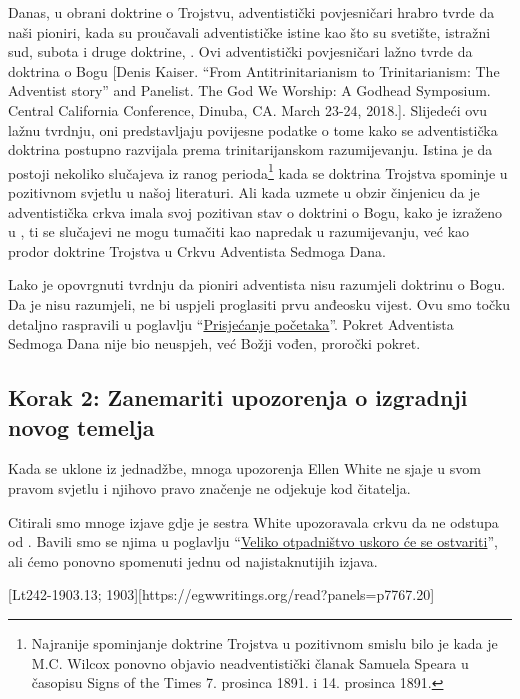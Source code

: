 Danas, u obrani doktrine o Trojstvu, adventistički povjesničari hrabro tvrde da naši pioniri, kada su proučavali adventističke istine kao što su svetište, istražni sud, subota i druge doktrine, . Ovi adventistički povjesničari lažno tvrde da doktrina o Bogu [Denis Kaiser. “From Antitrinitarianism to Trinitarianism: The Adventist story” and Panelist. The God We Worship: A Godhead Symposium. Central California Conference, Dinuba, CA. March 23-24, 2018.]. Slijedeći ovu lažnu tvrdnju, oni predstavljaju povijesne podatke o tome kako se adventistička doktrina postupno razvijala prema trinitarijanskom razumijevanju. Istina je da postoji nekoliko slučajeva iz ranog perioda\footnote{Najranije spominjanje doktrine Trojstva u pozitivnom smislu bilo je kada je M.C. Wilcox ponovno objavio neadventistički članak Samuela Speara u časopisu Signs of the Times 7. prosinca 1891. i 14. prosinca 1891.} kada se doktrina Trojstva spominje u pozitivnom svjetlu u našoj literaturi. Ali kada uzmete u obzir činjenicu da je adventistička crkva imala svoj pozitivan stav o doktrini o Bogu, kako je izraženo u , ti se slučajevi ne mogu tumačiti kao napredak u razumijevanju, već kao prodor doktrine Trojstva u Crkvu Adventista Sedmoga Dana.

Lako je opovrgnuti tvrdnju da pioniri adventista nisu razumjeli doktrinu o Bogu. Da je nisu razumjeli, ne bi uspjeli proglasiti prvu anđeosku vijest. Ovu smo točku detaljno raspravili u poglavlju “\hyperref[chap:remembering-the-beginning]{Prisjećanje početaka}”. Pokret Adventista Sedmoga Dana nije bio neuspjeh, već Božji vođen, proročki pokret.

\subsection*{Korak 2: Zanemariti upozorenja o izgradnji novog temelja}

Kada se  uklone iz jednadžbe, mnoga upozorenja Ellen White ne sjaje u svom pravom svjetlu i njihovo pravo značenje ne odjekuje kod čitatelja.

Citirali smo mnoge izjave gdje je sestra White upozoravala crkvu da ne odstupa od . Bavili smo se njima u poglavlju “\hyperref[chap:apostasy]{Veliko otpadništvo uskoro će se ostvariti}”, ali ćemo ponovno spomenuti jednu od najistaknutijih izjava.

[Lt242-1903.13; 1903][https://egwwritings.org/read?panels=p7767.20]

